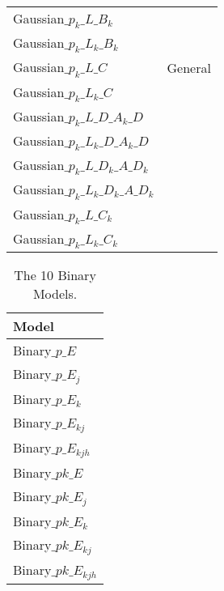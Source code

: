 \begin{table}[!h]
{\begin{center}
\begin{tabular}{|l|l|}
Gaussian$\_p_k\_L\_B_k$           & \\
Gaussian$\_p_k\_L_k\_B_k$         & \\
\hline
Gaussian$\_p_k\_L\_C$             & General \\
Gaussian$\_p_k\_L_k\_C$           & \\
Gaussian$\_p_k\_L\_D\_A_k\_D$     & \\
Gaussian$\_p_k\_L_k\_D\_A_k\_D$   & \\
Gaussian$\_p_k\_L\_D_k\_A\_D_k$   & \\
Gaussian$\_p_k\_L_k\_D_k\_A\_D_k$ & \\
Gaussian$\_p_k\_L\_C_k$           & \\
Gaussian$\_p_k\_L_k\_C_k$         & \\
\hline
\end{tabular}
\end{center}}
\end{table}








\begin{table}[!h]
\caption{The 10 Binary Models.}
{\small
\label{10models}
\begin{center}
\begin{tabular}{|l|}
\hline
Model \\
\hline
Binary$\_p\_E$ \\
Binary$\_p\_E_j$ \\
Binary$\_p\_E_k$ \\
Binary$\_p\_E_{kj}$ \\
Binary$\_p\_E_{kjh}$  \\
Binary$\_pk\_E$ \\
Binary$\_pk\_E_j$  \\
Binary$\_pk\_E_k$\\
Binary$\_pk\_E_{kj}$ \\
Binary$\_pk\_E_{kjh}$\\
\hline
\end{tabular}
\end{center}}
\end{table}






